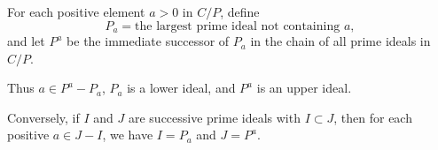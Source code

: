 For each positive element $a > 0$ in $C/P$, define
$$P_a = \text{the largest prime ideal not containing } a,$$
and let $P^a$ be the immediate successor of $P_a$ in the chain of all prime ideals in $C/P$.

Thus $a \in P^a - P_a$, $P_a$ is a lower ideal, and $P^a$ is an upper ideal.

Conversely, if $I$ and $J$ are successive prime ideals with $I \subset J$, then for each positive $a \in J - I$, we have $I = P_a$ and $J = P^a$.
